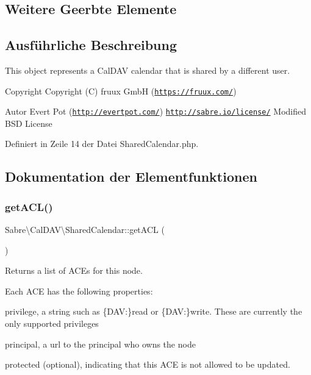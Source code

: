 \subsection*{Weitere Geerbte Elemente}


\subsection{Ausführliche Beschreibung}
This object represents a Cal\+D\+AV calendar that is shared by a different user.

\begin{DoxyCopyright}{Copyright}
Copyright (C) fruux GmbH (\href{https://fruux.com/}{\tt https\+://fruux.\+com/}) 
\end{DoxyCopyright}
\begin{DoxyAuthor}{Autor}
Evert Pot (\href{http://evertpot.com/}{\tt http\+://evertpot.\+com/})  \href{http://sabre.io/license/}{\tt http\+://sabre.\+io/license/} Modified B\+SD License 
\end{DoxyAuthor}


Definiert in Zeile 14 der Datei Shared\+Calendar.\+php.



\subsection{Dokumentation der Elementfunktionen}
\mbox{\label{class_sabre_1_1_cal_d_a_v_1_1_shared_calendar_acc8f8f7412ce13e3c6d59eeb5fa3db35}} 
\subsubsection{\texorpdfstring{get\+A\+C\+L()}{getACL()}}
{\footnotesize\ttfamily Sabre\textbackslash{}\+Cal\+D\+A\+V\textbackslash{}\+Shared\+Calendar\+::get\+A\+CL (\begin{DoxyParamCaption}{ }\end{DoxyParamCaption})}

Returns a list of A\+CE\textquotesingle{}s for this node.

Each A\+CE has the following properties\+:
\begin{DoxyItemize}
\item \textquotesingle{}privilege\textquotesingle{}, a string such as \{D\+AV\+:\}read or \{D\+AV\+:\}write. These are currently the only supported privileges
\item \textquotesingle{}principal\textquotesingle{}, a url to the principal who owns the node
\item \textquotesingle{}protected\textquotesingle{} (optional), indicating that this A\+CE is not allowed to be updated.
\end{DoxyItemize}

